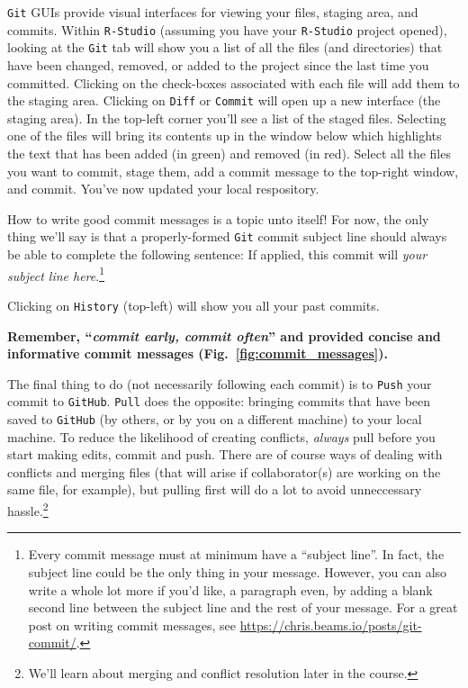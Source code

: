 \documentclass[12pt,letterpaper]{article}
\begin{document}
\texttt{Git} GUIs provide visual interfaces for viewing your files, staging area, 
and commits.
Within \texttt{R-Studio} (assuming you have your \texttt{R-Studio} project 
opened), looking at the \texttt{Git} tab will show you a list of all the files (and 
directories) that have been changed, removed, or added to the project since the 
last time you committed.
Clicking on the check-boxes associated with each file will add them to the staging area.
Clicking on \texttt{Diff} or \texttt{Commit} will open up a new interface (the staging area).
In the top-left corner you'll see a list of the staged files.
Selecting one of the files will bring its contents up in the window below which highlights the text that has been added (in green) and removed (in red).
Select all the files you want to commit, stage them, add a commit message to the top-right window, and commit.
You've now updated your local respository.

How to write good commit messages is a topic unto itself!  For now, the only thing we'll say is that a properly-formed \texttt{Git} commit subject line should always be able to complete the following sentence:  If applied, this commit will \emph{your subject line here}.\footnote{Every commit message must at minimum have a ``subject line''.  In fact, the subject line could be the only thing in your message.  However, you can also write a whole lot more if you'd like, a paragraph even, by adding a blank second line between the subject line and the rest of your message.  For a great post on writing commit messages, see \url{https://chris.beams.io/posts/git-commit/}.}

Clicking on \texttt{History} (top-left) will show you all your past commits.

\textbf{Remember, ``\emph{commit early, commit often}'' and provided concise and informative commit messages (Fig.~\ref{fig:commit_messages}).}

The final thing to do (not necessarily following each commit) is to \texttt{Push} 
your commit to \texttt{GitHub}.
\texttt{Pull} does the opposite: bringing commits that have been saved to 
\texttt{GitHub} (by others, or by you on a different machine) to your local 
machine.
To reduce the likelihood of creating conflicts, \emph{always} pull before you start making edits, commit and push.
There are of course ways of dealing with conflicts and merging files (that will arise if collaborator(s) are working on the same file, for example), but pulling first will do a lot to avoid unneccessary hassle.\footnote{We'll learn about merging and conflict resolution later in the course.}
\end{document}
